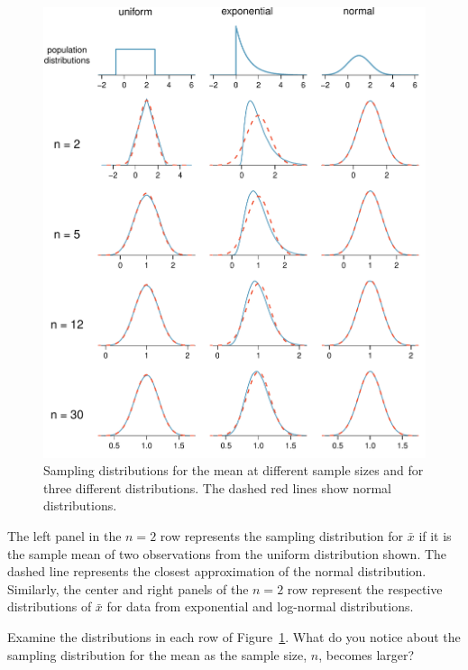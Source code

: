 \begin{figure}
   \centering
   \includegraphics[width=\textwidth]{ch_distributions/figures/cltSimulations/cltSimulations}
   \caption{Sampling distributions for the mean at different sample sizes and for three different distributions. The dashed red lines show normal distributions.}
   \label{cltSimulations}
\end{figure}

The left panel in the $n=2$ row represents the sampling distribution for $\bar{x}$ if it is the sample mean of two observations from the uniform distribution shown. The dashed line represents the closest approximation of the normal distribution. Similarly, the center and right panels of the $n=2$ row represent the respective distributions of $\bar{x}$ for data from exponential and log-normal distributions.

\begin{exercisewrap}
\begin{nexercise}
Examine the distributions in each row of Figure~\ref{cltSimulations}. What do you notice about the sampling distribution for the mean as the sample size, $n$, becomes larger?\footnotemark
\end{nexercise}
\end{exercisewrap}


